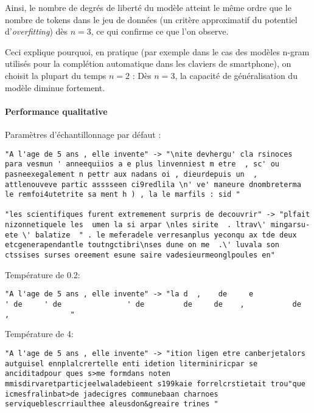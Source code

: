 Ainsi, le nombre de degrés de liberté du modèle atteint le même ordre
que le nombre de tokens dans le jeu de données (un critère approximatif
du potentiel d'\emph{overfitting}) dès \(n=3\), ce qui confirme ce que
l'on observe.

Ceci explique pourquoi, en pratique (par exemple dans le cas des modèles
n-gram utilisés pour la complétion automatique dans les claviers de
smartphone), on choisit la plupart du temps \(n=2\) : Dès \(n=3\), la
capacité de généralisation du modèle diminue fortement.

\hypertarget{performance-qualitative}{%
\paragraph{Performance qualitative}\label{performance-qualitative}}

Paramètres d'échantillonnage par défaut :

\begin{verbatim}
"A l'age de 5 ans , elle invente" -> "\nite devhergu' cla rsinoces para vesmun ' anneequiios a e plus linvenniest m etre  , sc' ou pasneexegalement n pettr aux nadans oi , dieurdepuis un  , attlenouveve partic asssseen ci9redlila \n' ve' maneure dnombreterma le remfoi4utetrite sa ment h ) , la le marfils : sid "

"les scientifiques furent extremement surpris de decouvrir" -> "plfait nizonnetiquele les  umen la si arpar \nles sirite  . ltrav\' mingarsu-ete \' balatize  " . le meferadele verresanplus yeconqu ax tde deux  etcgenerapendantle toutngctibri\nses dune on me  .\' luvala son ctssises surses oreement esune saire vadesieurmeonglpoules en"
\end{verbatim}

Température de 0.2:

\begin{verbatim}
"A l'age de 5 ans , elle invente" -> "la d  ,    de     e                  ' de     ' de               ' de         de     de    ,           de      ,              "
\end{verbatim}

Température de 4:

\begin{verbatim}
"A l'age de 5 ans , elle invente" -> "ition ligen etre canberjetalors autguisel ennplalcrertelle enti idetion literminiricpar se anciditadpour ques s>me formdans noten mmisdirvaretparticjeelwaladebieent s199kaie forrelcrstietait trou"que icmesfralinbat>de jadecigres communebaan charnoes serviqueblescrriaulthee aleusdon&greaire trines "
\end{verbatim}

